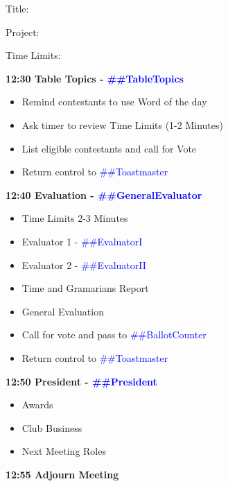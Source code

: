 \documentclass{article}
\newcommand{\toastmaster}{##Toastmaster}
\newcommand{\president}{##President}
\newcommand{\tableTopics}{##TableTopics}
\newcommand{\generalEvaluator}{##GeneralEvaluator}
\newcommand{\evaluatorI}{##EvaluatorI}
\newcommand{\evaluatorII}{##EvaluatorII}
\newcommand{\ballotCounter}{##BallotCounter}
\begin{document}
\begin{spacing}{.8}
\begin{itemize}
\begin{description}
          \item{Title:}
          \item{Project:}
          \item{Time Limits:}
      \end{description}
  \end{itemize}
  {\Large \bf12:30 Table Topics - \textcolor{blue}{\tableTopics{}}} 
  \begin{itemize}
    \item Remind contestants to use Word of the day
    \item Ask timer to review Time Limits  (1-2 Minutes)
    \item List eligible contestants and call for Vote
    \item Return control to \textcolor{blue}{\toastmaster{}}
  \end{itemize}
  {\Large \bf12:40 Evaluation - \textcolor{blue}{\generalEvaluator{}}} 
  \begin{itemize}
    \item Time Limits 2-3 Minutes
    \item Evaluator 1 - \textcolor{blue}{\evaluatorI{}}
    \item Evaluator 2 - \textcolor{blue}{\evaluatorII{}}
	\item Time and Gramarians Report
	\item General Evaluation
    \item Call for vote and pass to \textcolor{blue}{\ballotCounter{}}
    \item Return control to \textcolor{blue}{\toastmaster{}}
  \end{itemize}
  {\Large \bf12:50 President - \textcolor{blue}{\president{}}} 
  \begin{itemize}
    \item Awards
    \item Club Business
    \item Next Meeting Roles
  \end{itemize}
  {\Large \bf12:55 Adjourn Meeting} 
  \end{spacing}
  
\end{document}
